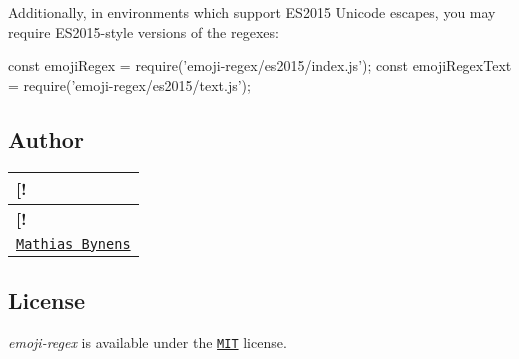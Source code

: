 Additionally, in environments which support E\+S2015 Unicode escapes, you may {\ttfamily require} E\+S2015-\/style versions of the regexes\+:


\begin{DoxyCode}
const emojiRegex = require('emoji-regex/es2015/index.js');
const emojiRegexText = require('emoji-regex/es2015/text.js');
\end{DoxyCode}


\subsection*{Author}

\tabulinesep=1mm
\begin{longtabu} spread 0pt [c]{*{1}{|X[-1]}|}
\hline
\rowcolor{\tableheadbgcolor}\textbf{ \mbox{[}!   }\\
\endfirsthead
\hline
\endfoot
\hline
\rowcolor{\tableheadbgcolor}\textbf{ \mbox{[}!   }\\
\endhead
\href{https://mathiasbynens.be/}{\tt Mathias Bynens}   \\
\end{longtabu}


\subsection*{License}

{\itshape emoji-\/regex} is available under the \href{https://mths.be/mit}{\tt M\+IT} license. 